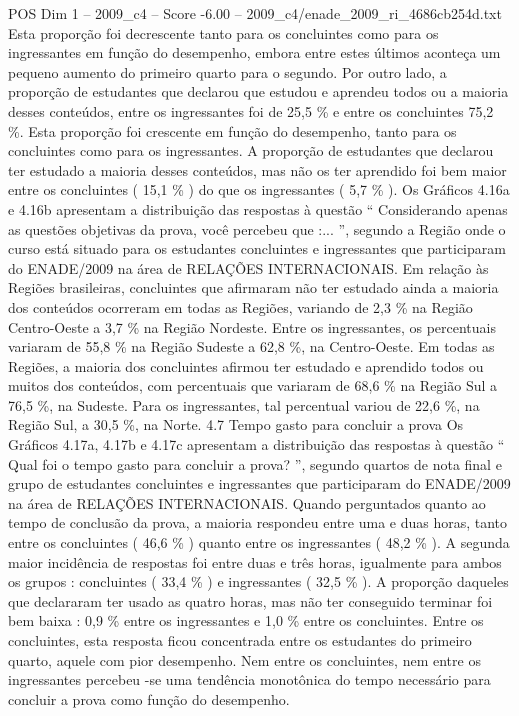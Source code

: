 \begin{textsample}{POS Dim 1 – 2009\_c4 – Score -6.00 – 2009\_c4/enade\_2009\_ri\_4686cb254d.txt}
Esta proporção foi decrescente tanto para os concluintes como para os ingressantes em função do desempenho, embora entre estes últimos aconteça um pequeno aumento do primeiro quarto para o segundo.
Por outro lado, a proporção de estudantes que declarou que estudou e aprendeu todos ou a maioria desses conteúdos, entre os ingressantes foi de 25,5 \% e entre os concluintes 75,2 \%.
Esta proporção foi crescente em função do desempenho, tanto para os concluintes como para os ingressantes.
A proporção de estudantes que declarou ter estudado a maioria desses conteúdos, mas não os ter aprendido foi bem maior entre os concluintes ( 15,1 \% ) do que os ingressantes ( 5,7 \% ).
Os Gráficos 4.16a e 4.16b apresentam a distribuição das respostas à questão “ Considerando apenas as questões objetivas da prova, você percebeu que :... ”, segundo a Região onde o curso está situado para os estudantes concluintes e ingressantes que participaram do ENADE/2009 na área de RELAÇÕES INTERNACIONAIS.
Em relação às Regiões brasileiras, concluintes que afirmaram não ter estudado ainda a maioria dos conteúdos ocorreram em todas as Regiões, variando de 2,3 \% na Região Centro-Oeste a 3,7 \% na Região Nordeste.
Entre os ingressantes, os percentuais variaram de 55,8 \% na Região Sudeste a 62,8 \%, na Centro-Oeste.
Em todas as Regiões, a maioria dos concluintes afirmou ter estudado e aprendido todos ou muitos dos conteúdos, com percentuais que variaram de 68,6 \% na Região Sul a 76,5 \%, na Sudeste.
Para os ingressantes, tal percentual variou de 22,6 \%, na Região Sul, a 30,5 \%, na Norte. 4.7 Tempo gasto para concluir a prova Os Gráficos 4.17a, 4.17b e 4.17c apresentam a distribuição das respostas à questão “ Qual foi o tempo gasto para concluir a prova? ”, segundo quartos de nota final e grupo de estudantes concluintes e ingressantes que participaram do ENADE/2009 na área de RELAÇÕES INTERNACIONAIS.
Quando perguntados quanto ao tempo de conclusão da prova, a maioria respondeu entre uma e duas horas, tanto entre os concluintes ( 46,6 \% ) quanto entre os ingressantes ( 48,2 \% ).
A segunda maior incidência de respostas foi entre duas e três horas, igualmente para ambos os grupos : concluintes ( 33,4 \% ) e ingressantes ( 32,5 \% ).
A proporção daqueles que declararam ter usado as quatro horas, mas não ter conseguido terminar foi bem baixa : 0,9 \% entre os ingressantes e 1,0 \% entre os concluintes.
Entre os concluintes, esta resposta ficou concentrada entre os estudantes do primeiro quarto, aquele com pior desempenho.
Nem entre os concluintes, nem entre os ingressantes percebeu -se uma tendência monotônica do tempo necessário para concluir a prova como função do desempenho.

\end{textsample}
